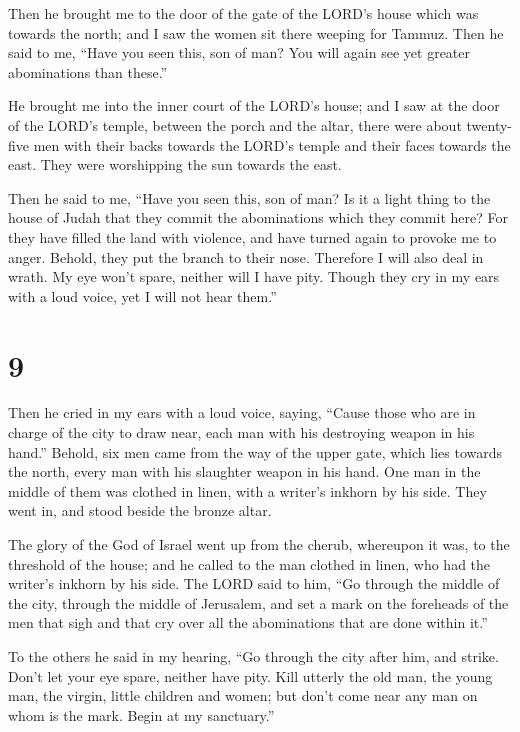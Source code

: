  Then he brought me to the door of the gate of the LORD's
house which was towards the north; and I saw the women sit there weeping
for Tammuz.  Then he said to me, ``Have you seen this, son
of man? You will again see yet greater abominations than these.''

 He brought me into the inner court of the LORD's house;
and I saw at the door of the LORD's temple, between the porch and the
altar, there were about twenty-five men with their backs towards the
LORD's temple and their faces towards the east. They were worshipping
the sun towards the east.

 Then he said to me, ``Have you seen this, son of man? Is
it a light thing to the house of Judah that they commit the abominations
which they commit here? For they have filled the land with violence, and
have turned again to provoke me to anger. Behold, they put the branch to
their nose.  Therefore I will also deal in wrath. My eye
won't spare, neither will I have pity. Though they cry in my ears with a
loud voice, yet I will not hear them.''

\hypertarget{section-7}{%
\section{9}\label{section-7}}

 Then he cried in my ears with a loud voice, saying, ``Cause
those who are in charge of the city to draw near, each man with his
destroying weapon in his hand.''  Behold, six men came from
the way of the upper gate, which lies towards the north, every man with
his slaughter weapon in his hand. One man in the middle of them was
clothed in linen, with a writer's inkhorn by his side. They went in, and
stood beside the bronze altar.

 The glory of the God of Israel went up from the cherub,
whereupon it was, to the threshold of the house; and he called to the
man clothed in linen, who had the writer's inkhorn by his side.
 The LORD said to him, ``Go through the middle of the city,
through the middle of Jerusalem, and set a mark on the foreheads of the
men that sigh and that cry over all the abominations that are done
within it.''

 To the others he said in my hearing, ``Go through the city
after him, and strike. Don't let your eye spare, neither have pity.
 Kill utterly the old man, the young man, the virgin, little
children and women; but don't come near any man on whom is the mark.
Begin at my sanctuary.''

